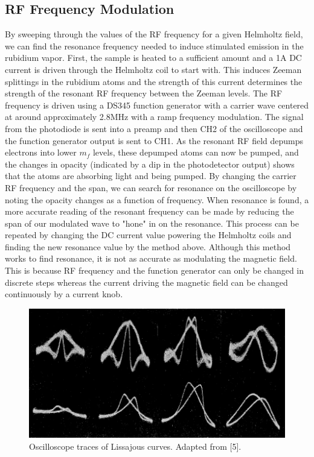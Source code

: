 \documentclass[%
 aip,
rsi,%
 amsmath,amssymb,
 reprint,%
author-numerical,%
]{revtex4-1}
\begin{document}
\subsection{RF Frequency Modulation}
By sweeping through the values of the RF frequency for a given Helmholtz field, we can find the resonance frequency needed to induce stimulated emission in the rubidium vapor. \newline
\indent First, the sample is heated to a sufficient amount and a 1A DC current is driven through the Helmholtz coil to start with. This induces Zeeman splittings in the rubidium atoms and the strength of this current determines the strength of the resonant RF frequency between the Zeeman levels. The RF frequency is driven using a DS345 function generator with a carrier wave centered at around approximately 2.8MHz with a ramp frequency modulation. \newline
\indent The signal from the photodiode is sent into a preamp and then CH2 of the oscilloscope and the function generator output is sent to CH1. As the resonant RF field depumps electrons into lower $m_{f}$ levels, these depumped atoms can now be pumped, and the changes in opacity (indicated by a dip in the photodetector output) shows that the atoms are absorbing light and being pumped. \newline
\indent By changing the carrier RF frequency and the span, we can search for resonance on the oscilloscope by noting the opacity changes as a function of frequency. When resonance is found, a more accurate reading of the resonant frequency can be made by reducing the span of our modulated wave to "hone" in on the resonance. This process can be repeated by changing the DC current value powering the Helmholtz coils and finding the new resonance value by the method above. \newline
\indent Although this method works to find resonance, it is not as accurate as modulating the magnetic field. This is because RF frequency and the function generator can only be changed in discrete steps whereas the current driving the magnetic field can be changed continuously by a current knob.

\begin{figure}
\center
\includegraphics[width=1\linewidth]{lateximages/lissajous}
\caption{\label{fig:lissajous}  Oscilloscope traces of Lissajous curves. Adapted from [5]. }
\end{figure}
\end{document}
